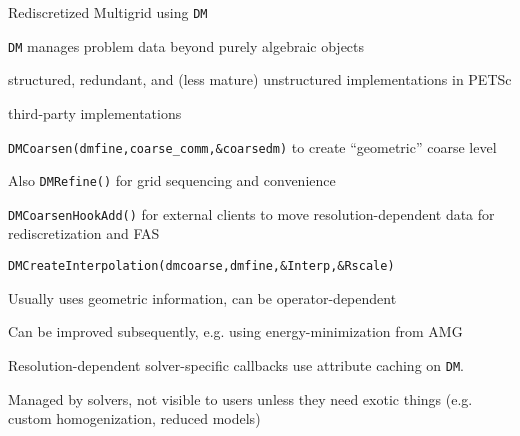 \begin{frame}[shrink=5]{Rediscretized Multigrid using \texttt{DM}}
  \begin{itemize}
{\small
  \item \texttt{DM} manages problem data beyond purely algebraic objects
    \begin{itemize}
{\small
    \item structured, redundant, and (less mature) unstructured implementations in PETSc
    \item third-party implementations
}
    \end{itemize}
  \item \texttt{DMCoarsen(dmfine,coarse\_comm,\&coarsedm)} to create ``geometric'' coarse level
    \begin{itemize}
{\small
    \item Also \texttt{DMRefine()} for grid sequencing and convenience
    \item \texttt{DMCoarsenHookAdd()} for external clients to move resolution-dependent data for rediscretization and FAS
}
    \end{itemize}
  \item \texttt{DMCreateInterpolation(dmcoarse,dmfine,\&Interp,\&Rscale)}
    \begin{itemize}
{\small
    \item Usually uses geometric information, can be operator-dependent
    \item Can be improved subsequently, e.g. using energy-minimization from AMG
}
    \end{itemize}
  \item Resolution-dependent solver-specific callbacks use attribute caching on \texttt{DM}.
    \begin{itemize}
{\small
    \item Managed by solvers, not visible to users unless they need exotic things (e.g. custom homogenization, reduced models)
}
    \end{itemize}
}
  \end{itemize}
\end{frame}
